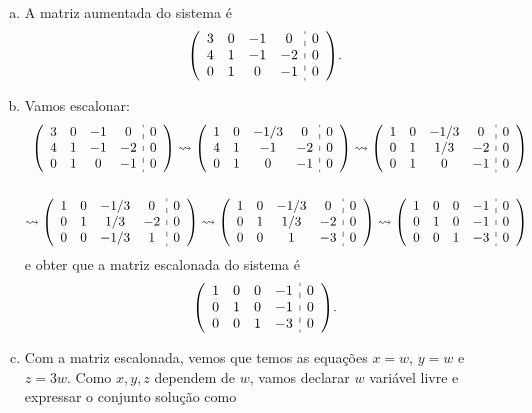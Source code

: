 \documentclass[a4paper,10pt]{article}
\newenvironment{sol}{\begin{tcolorbox}[breakable,colback=blue!5!white,colframe=blue!40!white,title=\normalsize {\sc{Solução}},coltitle=black]}{\end{tcolorbox}}
\newenvironment{augmatrix}{\left(\begin{array}}{\end{array}\right)}
\begin{document}
\begin{sol}
	\begin{enumerate}[a)]
		\item A matriz aumentada do sistema é
		\[\begin{augmatrix}{cccc:c}
		3&0&-1&0&0\\
		4&1&-1&-2&0\\
		0&1&0&-1&0
		\end{augmatrix}.\]
		\item Vamos escalonar:
		\begin{align*}
		\begin{augmatrix}{cccc:c}
		3&0&-1&0&0\\
		4&1&-1&-2&0\\
		0&1&0&-1&0
		\end{augmatrix}\rightsquigarrow\begin{augmatrix}{cccc:c}
		1&0&-1/3&0&0\\
		4&1&-1&-2&0\\
		0&1&0&-1&0
		\end{augmatrix}\rightsquigarrow\begin{augmatrix}{cccc:c}
		1&0&-1/3&0&0\\
		0&1&1/3&-2&0\\
		0&1&0&-1&0
		\end{augmatrix}\\\\
		\rightsquigarrow\begin{augmatrix}{cccc:c}
		1&0&-1/3&0&0\\
		0&1&1/3&-2&0\\
		0&0&-1/3&1&0
		\end{augmatrix}
		\rightsquigarrow\begin{augmatrix}{cccc:c}
		1&0&-1/3&0&0\\
		0&1&1/3&-2&0\\
		0&0&1&-3&0
		\end{augmatrix}\rightsquigarrow\begin{augmatrix}{cccc:c}
		1&0&0&-1&0\\
		0&1&0&-1&0\\
		0&0&1&-3&0
		\end{augmatrix}
		\end{align*}e obter que a matriz escalonada do sistema é \[\begin{augmatrix}{cccc:c}
		1&0&0&-1&0\\
		0&1&0&- 1&0\\
		0&0&1&-3&0
		\end{augmatrix}.\]
		\item Com a matriz escalonada, vemos que temos as equações $x=w$, $y=w$ e $z=3w$. Como $x,y,z$ dependem de $w$, vamos declarar $w$ variável livre e expressar o conjunto solução como

\end{enumerate}
\end{sol}
\end{document}

